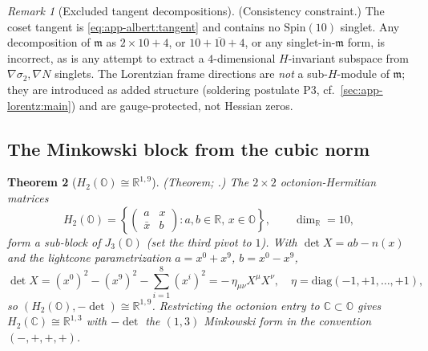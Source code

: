 \documentclass[11pt]{article}
\theoremstyle{plain}
\newtheorem{theorem}{Theorem}[section]
\theoremstyle{definition}
\theoremstyle{remark}
\newtheorem{remark}[theorem]{Remark}
\begin{document}
\begin{remark}[Excluded tangent decompositions]\label{rmk:app-albert:forbidden}
\textup{(Consistency constraint.)}
The coset tangent is \eqref{eq:app-albert:tangent} and contains no
$\mathrm{Spin}(10)$ singlet. Any decomposition of $\mathfrak m$ as $2\times10+4$,
or $10+\overline{10}+4$, or any singlet-in-$\mathfrak m$ form, is incorrect, as is
any attempt to extract a $4$-dimensional $H$-invariant subspace from
$\nabla\sigma_2,\nabla N$ singlets. The Lorentzian frame directions are
\emph{not} a sub-$H$-module of $\mathfrak m$; they are introduced as added
structure (soldering postulate P3, cf.\ \autoref{sec:app-lorentz:main}) and are
gauge-protected, not Hessian zeros.
\end{remark}

\subsection{The Minkowski block from the cubic norm}
\label{sec:app-albert:minkowski}

\begin{theorem}[$H_2(\mathbb O)\cong\mathbb R^{1,9}$]\label{thm:app-albert:minkowski}
\textup{(Theorem; \cite{Baez:2002,Sudbery:1984}.)}
The $2\times2$ octonion-Hermitian matrices
\begin{equation}\label{eq:app-albert:H2O}
  H_2(\mathbb O)=
  \left\{\begin{pmatrix}a & x\\ \bar x & b\end{pmatrix}:a,b\in\mathbb R,\,x\in
  \mathbb O\right\},
  \qquad \dim_{\mathbb R}=10,
\end{equation}
form a sub-block of $J_3(\mathbb O)$ (set the third pivot to $1$). With
$\det X=ab-n(x)$ and the lightcone parametrization $a=x^0+x^9$, $b=x^0-x^9$,
\begin{equation}\label{eq:app-albert:detmink}
  \det X=(x^0)^2-(x^9)^2-\textstyle\sum_{i=1}^{8}(x^i)^2
  =-\,\eta_{\mu\nu}X^\mu X^\nu,
  \quad \eta=\mathrm{diag}(-1,+1,\dots,+1),
\end{equation}
so $(H_2(\mathbb O),-\det)\cong\mathbb R^{1,9}$. Restricting the octonion entry to
$\mathbb C\subset\mathbb O$ gives $H_2(\mathbb C)\cong\mathbb R^{1,3}$ with
$-\det$ the $(1,3)$ Minkowski form in the convention $(-,+,+,+)$.
\end{theorem}
\end{document}

